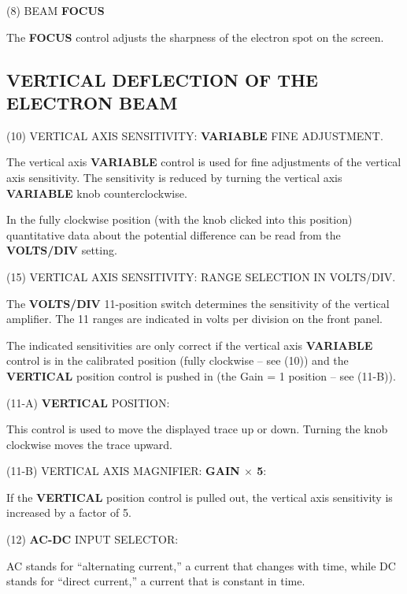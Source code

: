\indent (8) BEAM \textbf{FOCUS} \myskip

\indent \indent The \textbf{FOCUS} control adjusts the sharpness of the electron spot on the screen.

\subsection{VERTICAL DEFLECTION OF THE ELECTRON BEAM}

\indent \indent (10) VERTICAL AXIS SENSITIVITY: \textbf{VARIABLE} FINE ADJUSTMENT. \myskip

\indent \indent The vertical axis \textbf{VARIABLE} control is used for fine adjustments of the vertical axis sensitivity. The sensitivity is reduced by turning the vertical axis \textbf{VARIABLE} knob counterclockwise. \myskip

\indent \indent In the fully clockwise position (with the knob clicked into this position) quantitative data about the potential difference can be read from the \textbf{VOLTS/DIV} setting. \myskip

\indent (15) VERTICAL AXIS SENSITIVITY: RANGE SELECTION IN VOLTS/DIV.\myskip 

\indent \indent The \textbf{VOLTS/DIV} 11-position switch determines the sensitivity of the vertical amplifier. The 11 ranges are indicated in volts per division on the front panel. \myskip

\indent \indent The indicated sensitivities are only correct if the vertical axis \textbf{VARIABLE} control is in the calibrated position (fully clockwise -- see (10)) and the \textbf{VERTICAL} position control is pushed in (the Gain = 1 position -- see (11-B)).\myskip

\indent (11-A) \textbf{VERTICAL} POSITION: \myskip

\indent \indent This control is used to move the displayed trace up or down. Turning the knob clockwise moves the trace upward.\myskip

\indent (11-B) VERTICAL AXIS MAGNIFIER: \textbf{GAIN $\times$ 5}:\myskip

\indent \indent If the \textbf{VERTICAL} position control is pulled out, the vertical axis sensitivity is increased by a factor of 5.\myskip

\indent (12) \textbf{AC-DC} INPUT SELECTOR:\myskip

\indent \indent AC stands for ``alternating current,'' a current that changes with time, while DC stands for ``direct current,'' a current that is constant in time.\myskip

